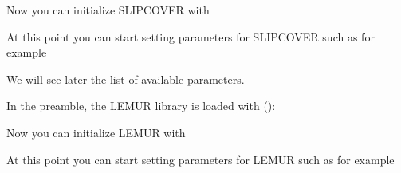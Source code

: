 \documentclass[letterpaper,10pt,english]{sphinxmanual}
\begin{document}
\sphinxAtStartPar
Now you can initialize SLIPCOVER with

\begin{sphinxVerbatim}[commandchars=\\\{\}]
 
\end{sphinxVerbatim}

\sphinxAtStartPar
At this point you can start setting parameters for SLIPCOVER such as for example

\begin{sphinxVerbatim}[commandchars=\\\{\}]
 
 
 
 
\end{sphinxVerbatim}

\sphinxAtStartPar
We will see later the list of available parameters.

\sphinxAtStartPar
In the preamble, the LEMUR library is loaded with ():

\begin{sphinxVerbatim}[commandchars=\\\{\}]
 
\end{sphinxVerbatim}

\sphinxAtStartPar
Now you can initialize LEMUR with

\begin{sphinxVerbatim}[commandchars=\\\{\}]
 
\end{sphinxVerbatim}

\sphinxAtStartPar
At this point you can start setting parameters for LEMUR such as for example

\begin{sphinxVerbatim}[commandchars=\\\{\}]
 
\end{sphinxVerbatim}
\end{document}
